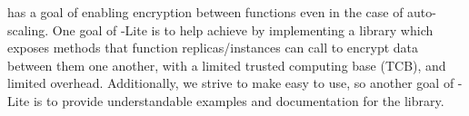 

\SystemName has a goal of enabling encryption between functions even in the case of auto-scaling.
One goal of \SystemName-Lite is to help achieve \SystemName by implementing a library which exposes methods that function replicas/instances can call to encrypt data between them one another, with a limited trusted computing base (TCB), and limited overhead.
Additionally, we strive to make \SystemName easy to use, so another goal of \SystemName-Lite is to provide understandable examples and documentation for the \SystemName library.

